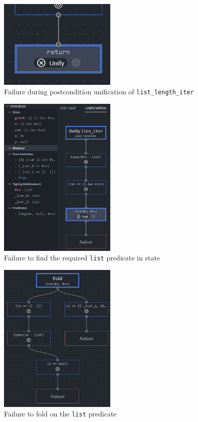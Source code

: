 \begin{figure}
  \centering
  \includegraphics[width=0.5\textwidth]{img/debug-example-execmap.png}
  \caption{
    Failure during postcondition unification of \texttt{list\_length\_iter}
  }\label{fig:debug-example-execmap}
\end{figure}

\begin{figure}
  \centering
  \includegraphics[width=0.5\textwidth]{img/debug-example-unifymap.png}
  \caption{
    Failure to find the required \texttt{list} predicate in state
  }\label{fig:debug-example-unifymap}
\end{figure}

\begin{figure}
  \centering
  \includegraphics[width=0.5\textwidth]{img/debug-example-fold.png}
  \caption{
    Failure to fold on the \texttt{list} predicate
  }\label{fig:debug-example-fold}
\end{figure}

